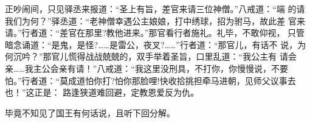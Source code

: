 正吵闹间，只见驿丞来报道：“圣上有旨，差官来请三位神僧。”八戒道：“端
的请我们为何？”驿丞道：“老神僧幸遇公主娘娘，打中绣球，招为驸马，故此差
官来请。”行者道：“差官在那里?教他进来。”那官看行者施礼。礼毕，不敢仰视，
只管暗念诵道：“是鬼，是怪?……是雷公，夜叉?……”行者道：“那官儿，有话不
说，为何沉吟？”那官儿慌得战战兢兢的，双手举着圣旨，口里乱道：“我公主有
请会亲……我主公会亲有请！”八戒道：“我这里没刑具，不打你，你慢慢说，不要
怕。”行者道：“莫成道怕你打?怕你那脸哩!快收拾挑担牵马进朝，见师父议事去
也！”这正是：
路逢狭道难回避，定教恩爱反为仇。

毕竟不知见了国王有何话说，且听下回分解。
